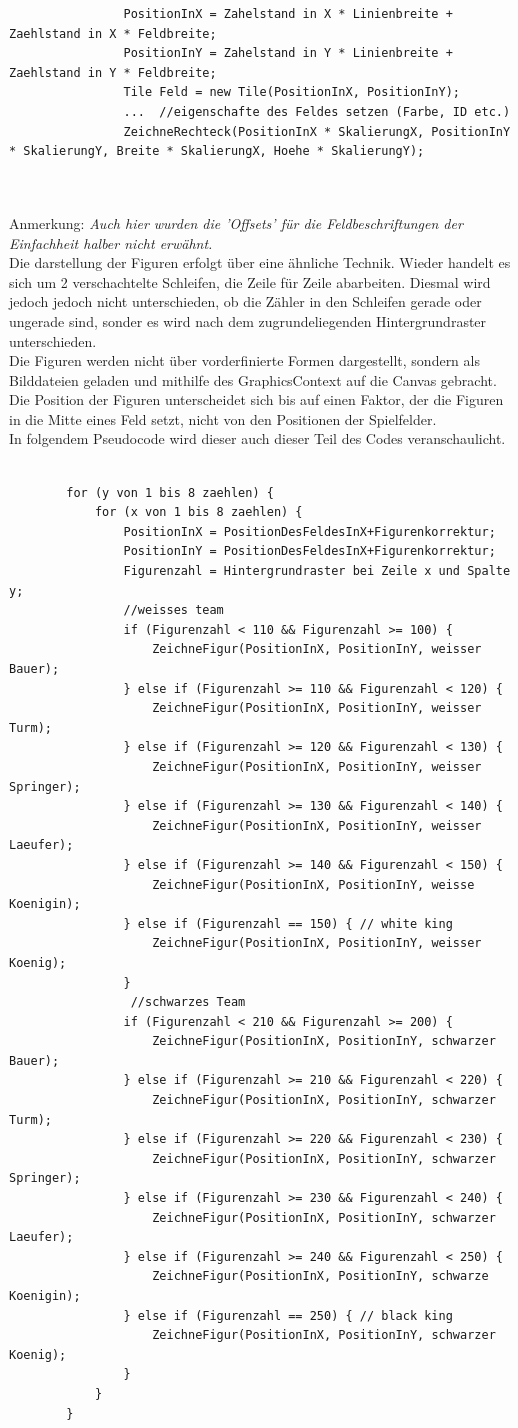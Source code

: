 \documentclass[12pt,a4paper]{article}
\begin{document}
{\begin{lstlisting}
				PositionInX = Zahelstand in X * Linienbreite + Zaehlstand in X * Feldbreite;
				PositionInY = Zahelstand in Y * Linienbreite + Zaehlstand in Y * Feldbreite;
				Tile Feld = new Tile(PositionInX, PositionInY);
 				...  //eigenschafte des Feldes setzen (Farbe, ID etc.)
				ZeichneRechteck(PositionInX * SkalierungX, PositionInY * SkalierungY, Breite * SkalierungX, Hoehe * SkalierungY);

	
\end{lstlisting}
Anmerkung: \textit{Auch hier wurden die 'Offsets' für die Feldbeschriftungen der Einfachheit halber nicht erwähnt.}\\[2ex]
Die darstellung der Figuren erfolgt über eine ähnliche Technik. Wieder handelt es sich um 2 verschachtelte Schleifen, die Zeile für Zeile abarbeiten. Diesmal wird jedoch jedoch nicht unterschieden, ob die Zähler in den Schleifen gerade oder ungerade sind, sonder es wird nach dem zugrundeliegenden Hintergrundraster unterschieden.\\
Die Figuren werden nicht über vorderfinierte Formen dargestellt, sondern als Bilddateien geladen und mithilfe des GraphicsContext auf die Canvas gebracht. Die Position der Figuren unterscheidet sich bis auf einen Faktor, der die Figuren in die Mitte eines Feld setzt, nicht von den Positionen der Spielfelder. \\[2ex]
In folgendem Pseudocode wird dieser auch dieser Teil des Codes veranschaulicht.
\lstset{language=java}
\begin{lstlisting}

		for (y von 1 bis 8 zaehlen) {
			for (x von 1 bis 8 zaehlen) {	
				PositionInX = PositionDesFeldesInX+Figurenkorrektur;
				PositionInY = PositionDesFeldesInX+Figurenkorrektur;
				Figurenzahl = Hintergrundraster bei Zeile x und Spalte y;
				//weisses team
				if (Figurenzahl < 110 && Figurenzahl >= 100) {
					ZeichneFigur(PositionInX, PositionInY, weisser Bauer);
				} else if (Figurenzahl >= 110 && Figurenzahl < 120) {
					ZeichneFigur(PositionInX, PositionInY, weisser Turm);
				} else if (Figurenzahl >= 120 && Figurenzahl < 130) { 
					ZeichneFigur(PositionInX, PositionInY, weisser Springer);
				} else if (Figurenzahl >= 130 && Figurenzahl < 140) { 
					ZeichneFigur(PositionInX, PositionInY, weisser Laeufer);
				} else if (Figurenzahl >= 140 && Figurenzahl < 150) { 
					ZeichneFigur(PositionInX, PositionInY, weisse Koenigin);
				} else if (Figurenzahl == 150) { // white king
					ZeichneFigur(PositionInX, PositionInY, weisser Koenig);
				}				
				 //schwarzes Team
				if (Figurenzahl < 210 && Figurenzahl >= 200) {
					ZeichneFigur(PositionInX, PositionInY, schwarzer Bauer);
				} else if (Figurenzahl >= 210 && Figurenzahl < 220) {
					ZeichneFigur(PositionInX, PositionInY, schwarzer Turm);
				} else if (Figurenzahl >= 220 && Figurenzahl < 230) {
					ZeichneFigur(PositionInX, PositionInY, schwarzer Springer);
				} else if (Figurenzahl >= 230 && Figurenzahl < 240) {
					ZeichneFigur(PositionInX, PositionInY, schwarzer Laeufer);
				} else if (Figurenzahl >= 240 && Figurenzahl < 250) { 
					ZeichneFigur(PositionInX, PositionInY, schwarze Koenigin);
				} else if (Figurenzahl == 250) { // black king
					ZeichneFigur(PositionInX, PositionInY, schwarzer Koenig);
				}
			}
		}


\end{lstlisting}}
\end{document}
